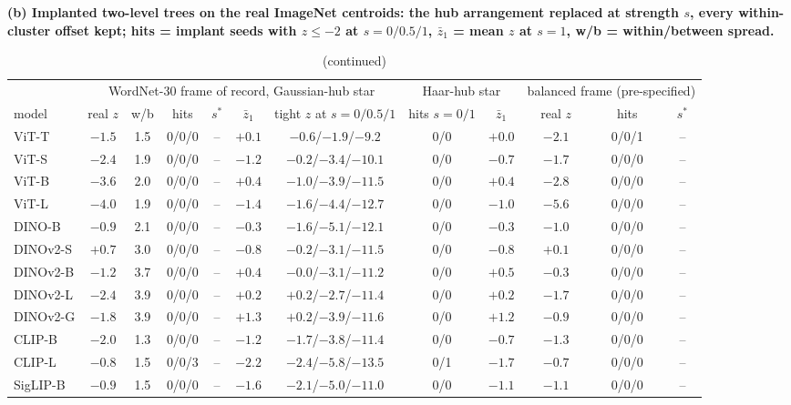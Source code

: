 \begin{table}[tbp]\ContinuedFloat
\centering
\scriptsize
\setlength{\tabcolsep}{2pt}
\begingroup
\noindent\textbf{(b) Implanted two-level trees on the real ImageNet centroids: the hub arrangement replaced at strength $s$, every within-cluster offset kept; hits = implant seeds with $z\le-2$ at $s{=}0/0.5/1$, $\bar z_1$ = mean $z$ at $s{=}1$, w/b = within/between spread.}\par\vspace{1.5pt}
\setlength{\tabcolsep}{1.8pt}
\begin{tabular}{lcccccc|cc|ccc}
\toprule
 & \multicolumn{6}{c|}{WordNet-30 frame of record, Gaussian-hub star} & \multicolumn{2}{c|}{Haar-hub star} & \multicolumn{3}{c}{balanced frame (pre-specified)} \\
model & real $z$ & w/b & hits & $s^*$ & $\bar z_1$ & tight $z$ at $s{=}0/0.5/1$ & hits $s{=}0/1$ & $\bar z_1$ & real $z$ & hits & $s^*$ \\
\midrule
ViT-T & $-1.5$ & 1.5 & 0/0/0 & -- & $+0.1$ & $-0.6$/$-1.9$/$-9.2$ & 0/0 & $+0.0$ & $-2.1$ & 0/0/1 & -- \\
ViT-S & $-2.4$ & 1.9 & 0/0/0 & -- & $-1.2$ & $-0.2$/$-3.4$/$-10.1$ & 0/0 & $-0.7$ & $-1.7$ & 0/0/0 & -- \\
ViT-B & $-3.6$ & 2.0 & 0/0/0 & -- & $+0.4$ & $-1.0$/$-3.9$/$-11.5$ & 0/0 & $+0.4$ & $-2.8$ & 0/0/0 & -- \\
ViT-L & $-4.0$ & 1.9 & 0/0/0 & -- & $-1.4$ & $-1.6$/$-4.4$/$-12.7$ & 0/0 & $-1.0$ & $-5.6$ & 0/0/0 & -- \\
\midrule
DINO-B & $-0.9$ & 2.1 & 0/0/0 & -- & $-0.3$ & $-1.6$/$-5.1$/$-12.1$ & 0/0 & $-0.3$ & $-1.0$ & 0/0/0 & -- \\
DINOv2-S & $+0.7$ & 3.0 & 0/0/0 & -- & $-0.8$ & $-0.2$/$-3.1$/$-11.5$ & 0/0 & $-0.8$ & $+0.1$ & 0/0/0 & -- \\
DINOv2-B & $-1.2$ & 3.7 & 0/0/0 & -- & $+0.4$ & $-0.0$/$-3.1$/$-11.2$ & 0/0 & $+0.5$ & $-0.3$ & 0/0/0 & -- \\
DINOv2-L & $-2.4$ & 3.9 & 0/0/0 & -- & $+0.2$ & $+0.2$/$-2.7$/$-11.4$ & 0/0 & $+0.2$ & $-1.7$ & 0/0/0 & -- \\
DINOv2-G & $-1.8$ & 3.9 & 0/0/0 & -- & $+1.3$ & $+0.2$/$-3.9$/$-11.6$ & 0/0 & $+1.2$ & $-0.9$ & 0/0/0 & -- \\
\midrule
CLIP-B & $-2.0$ & 1.3 & 0/0/0 & -- & $-1.2$ & $-1.7$/$-3.8$/$-11.4$ & 0/0 & $-0.7$ & $-1.3$ & 0/0/0 & -- \\
CLIP-L & $-0.8$ & 1.5 & 0/0/3 & -- & $-2.2$ & $-2.4$/$-5.8$/$-13.5$ & 0/1 & $-1.7$ & $-0.7$ & 0/0/0 & -- \\
SigLIP-B & $-0.9$ & 1.5 & 0/0/0 & -- & $-1.6$ & $-2.1$/$-5.0$/$-11.0$ & 0/0 & $-1.1$ & $-1.1$ & 0/0/0 & -- \\
\bottomrule
\end{tabular}
\par\vspace{5pt}
\endgroup
\caption{(continued)}
\end{table}
